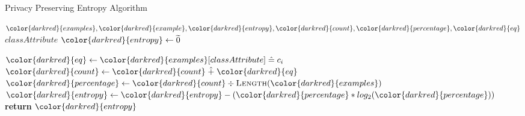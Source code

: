 \begin{algorithm}[H]
\caption{Privacy Preserving Entropy Algorithm}\label{a:id3-Entropy-pp}
\begin{algorithmic}[1]
\Require ${\color{darkred}{examples}}, {\color{darkred}{example}}, {\color{darkred}{entropy}}, {\color{darkred}{count}}, {\color{darkred}{percentage}}, {\color{darkred}{eq}}$
\renewcommand{\algorithmicrequire}{\textbf{Global Vars:}}
\Require $classAttribute$
    \State ${\color{darkred}{entropy}} \gets \enc{0}$

        \For{${\color{darkred}{example}} \in {\color{darkred}{examples}}$}
          \State ${\color{darkred}{eq}} \gets {\color{darkred}{examples}}[classAttribute] \heq c_i$
          \State ${\color{darkred}{count}} \gets {\color{darkred}{count}} \hplus {\color{darkred}{eq}}$
        \EndFor
        \State ${\color{darkred}{percentage}} \gets {\color{darkred}{count}} \div \textsc{Length}({\color{darkred}{examples}})$
        \State ${\color{darkred}{entropy}} \gets {\color{darkred}{entropy}} - ({\color{darkred}{percentage}} * log_2 ({\color{darkred}{percentage}}))$
    \EndFor
    \State \textbf{return} ${\color{darkred}{entropy}}$
\EndProcedure
\end{algorithmic}
\end{algorithm}
